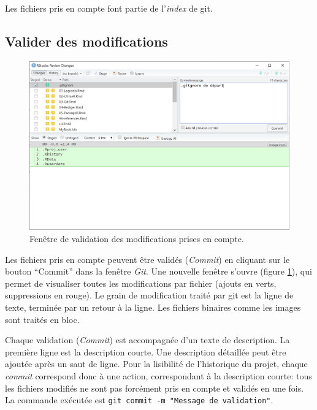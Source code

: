 \documentclass[
  12pt,
  french,
  a4paper,
  extrafontsizes,onecolumn,openright
  ]{memoir}
\begin{document}
Les fichiers pris en compte font partie de l'\emph{index} de git.

\subsection{Valider des modifications}\label{valider-des-modifications}



\scriptsize

\begin{figure}

{\centering \includegraphics[width=0.8\linewidth]{images/git-Commit} 

}

\caption{Fenêtre de validation des modifications prises en compte.}\label{fig:git-Commit}
\end{figure}

\normalsize

Les fichiers pris en compte peuvent être validés (\emph{Commit}) en cliquant sur le bouton \enquote{Commit} dans la fenêtre \emph{Git}.
Une nouvelle fenêtre s'ouvre (figure \ref{fig:git-Commit}), qui permet de visualiser toutes les modifications par fichier (ajouts en verts, suppressions en rouge).
Le grain de modification traité par git est la ligne de texte, terminée par un retour à la ligne.
Les fichiers binaires comme les images sont traités en bloc.

Chaque validation (\emph{Commit}) est accompagnée d'un texte de description.
La première ligne est la description courte.
Une description détaillée peut être ajoutée après un saut de ligne.
Pour la lisibilité de l'historique du projet, chaque \emph{commit} correspond donc à une action, correspondant à la description courte: tous les fichiers modifiés ne sont pas forcément pris en compte et validés en une fois.
La commande exécutée est \texttt{git\ commit\ -m\ "Message\ de\ validation"}.
\end{document}
